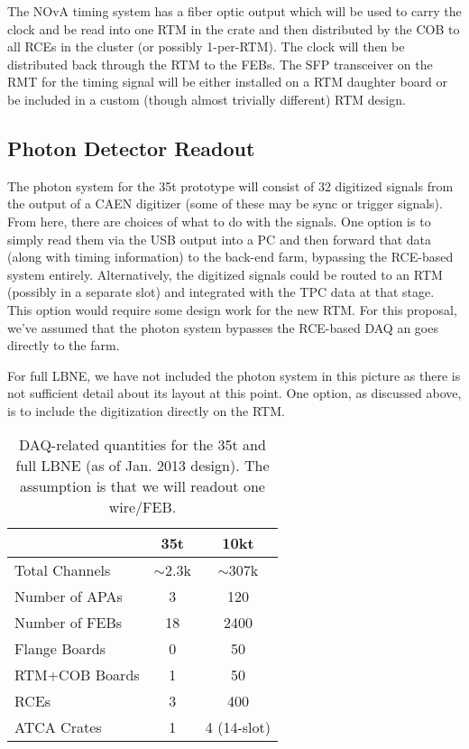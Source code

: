 The NOvA timing system has a fiber optic output which will be used to carry the clock and  be read into one RTM in the crate and then distributed by the COB to all RCEs in the cluster (or possibly 1-per-RTM).  The clock will then be distributed  back through the RTM to the FEBs.   The SFP transceiver on the RMT for the timing signal will be either installed on a RTM daughter board or be included in a custom (though almost trivially different) RTM design.  

\subsection{Photon Detector Readout}


The photon system for the 35t prototype will consist of 32 digitized signals from the output of a CAEN digitizer (some of these may be sync or trigger signals).  From here, there are choices of what to do with the signals.  One option is to simply read them via the USB output into a PC and then forward that data (along with timing information) to the back-end farm, bypassing the RCE-based system entirely.  Alternatively, the digitized signals could be routed to an RTM (possibly in a separate slot) and integrated with the TPC data at that stage.  This option would require some design work for the new RTM.  For this proposal, we've assumed that the photon system bypasses the RCE-based DAQ an goes directly to the farm.  

For full LBNE, we have not included the photon system in this picture as there is not sufficient detail about its layout at this point.   One option, as discussed above, is to include the digitization directly on the RTM.  

\begin{table}[tbh]
\begin{center}
\begin{tabular}{|l|c|c|}   
\hline \hline 
    & 35t  & 10kt \\      
\hline
   Total Channels        & $\sim$2.3k &$\sim$307k \\ 
	Number of APAs     &  3     &    120        \\ 
   Number of FEBs       & 18 & 2400 \\ 
   Flange Boards    & 0   & 50 \\ 
   RTM+COB Boards    & 1  &  50  \\
  RCEs                       & 3  &  400  \\
   ATCA Crates            & 1   &  4 (14-slot)   \\ 
\hline \hline
\end{tabular}
\caption[]{DAQ-related quantities for the 35t and full LBNE (as of Jan. 2013 design).  The assumption is that we will readout one wire/FEB.}
\label{tab:daqsumm} 
\end{center}
\end{table}



